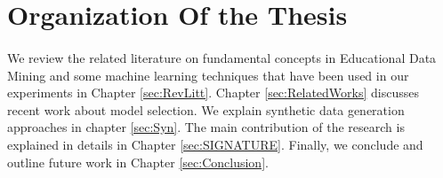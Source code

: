 \section{Organization Of the Thesis}
\paragraph{} We review the related literature on fundamental concepts in Educational Data Mining and some machine learning techniques that have been used in our experiments in Chapter \ref{sec:RevLitt}. Chapter \ref{sec:RelatedWorks} discusses recent work about model selection. We explain synthetic data generation approaches in chapter \ref{sec:Syn}. The main contribution of the research is explained in details in Chapter \ref{sec:SIGNATURE}. Finally, we conclude and outline future work in Chapter \ref{sec:Conclusion}. 


